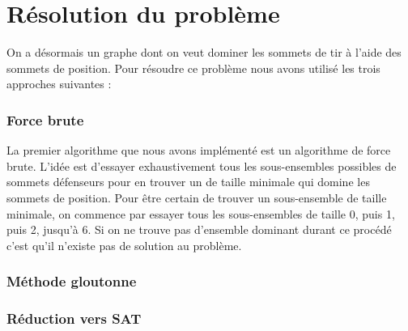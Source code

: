 \part{Résolution du problème}

On a désormais un graphe dont on veut dominer les sommets de tir à l'aide des sommets de position. Pour résoudre ce problème nous avons utilisé les trois approches suivantes :

\section{Force brute}

La premier algorithme que nous avons implémenté est un algorithme de force brute. L'idée est d'essayer exhaustivement tous les sous-ensembles possibles de sommets défenseurs pour en trouver un de taille minimale qui domine les sommets de position. Pour être certain de trouver un sous-ensemble de taille minimale, on commence par essayer tous les sous-ensembles de taille 0, puis 1, puis 2, jusqu'à 6. Si on ne trouve pas d'ensemble dominant durant ce procédé c'est qu'il n'existe pas de solution au problème.

\vspace{2\baselineskip}




\section{Méthode gloutonne}

\section{Réduction vers SAT}